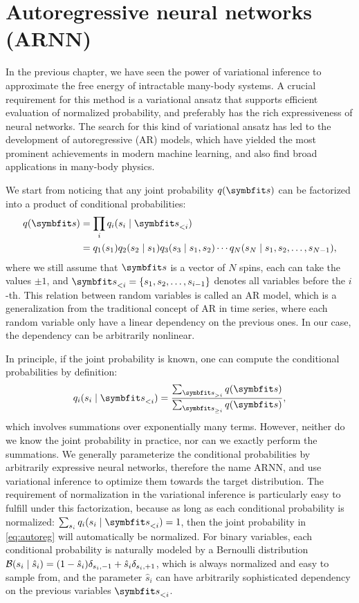 \chapter{Autoregressive neural networks (ARNN)}
\label{sec:arnn}

In the previous chapter, we have seen the power of variational inference to approximate the free energy of intractable many-body systems. A crucial requirement for this method is a variational ansatz that supports efficient evaluation of normalized probability, and preferably has the rich expressiveness of neural networks. The search for this kind of variational ansatz has led to the development of autoregressive (AR) models, which have yielded the most prominent achievements in modern machine learning, and also find broad applications in many-body physics.

We start from noticing that any joint probability $q(\vs)$ can be factorized into a product of conditional probabilities:
\begin{align}
q(\vs) &= \prod_i q_i(s_i \mid \vs_{< i}) \label{eq:autoreg} \\
&= q_1(s_1) q_2(s_2 \mid s_1) q_3(s_3 \mid s_1, s_2) \cdots q_N(s_N \mid s_1, s_2, \ldots, s_{N - 1}),
\end{align}
where we still assume that $\vs$ is a vector of $N$ spins, each can take the values $\pm 1$, and $\vs_{< i} = \{s_1, s_2, \ldots, s_{i - 1}\}$ denotes all variables before the $i$-th. This relation between random variables is called an AR model, which is a generalization from the traditional concept of AR in time series, where each random variable only have a linear dependency on the previous ones. In our case, the dependency can be arbitrarily nonlinear.

In principle, if the joint probability is known, one can compute the conditional probabilities by definition:
\begin{equation}
q_i(s_i \mid \vs_{< i}) = \frac{\sum_{\vs_{> i}} q(\vs)}{\sum_{\vs_{\ge i}} q(\vs)},
\end{equation}
which involves summations over exponentially many terms. However, neither do we know the joint probability in practice, nor can we exactly perform the summations. We generally parameterize the conditional probabilities by arbitrarily expressive neural networks, therefore the name ARNN, and use variational inference to optimize them towards the target distribution. The requirement of normalization in the variational inference is particularly easy to fulfill under this factorization, because as long as each conditional probability is normalized: $\sum_{s_i} q_i(s_i \mid \vs_{< i}) = 1$, then the joint probability in \cref{eq:autoreg} will automatically be normalized. For binary variables, each conditional probability is naturally modeled by a Bernoulli distribution $\mathcal{B}(s_i \mid \hat{s}_i) = (1 - \hat{s}_i) \delta_{s_i, -1} + \hat{s}_i \delta_{s_i, +1}$, which is always normalized and easy to sample from, and the parameter $\hat{s}_i$ can have arbitrarily sophisticated dependency on the previous variables $\vs_{< i}$.

